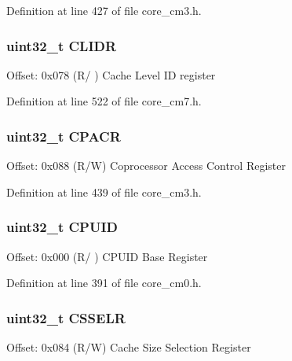 Definition at line 427 of file core\+\_\+cm3.\+h.

\subsubsection[{\texorpdfstring{C\+L\+I\+DR}{CLIDR}}]{ uint32\+\_\+t C\+L\+I\+DR}\hypertarget{struct_s_c_b___type_a40b4dc749a25d1c95c2125e88683a591}{}\label{struct_s_c_b___type_a40b4dc749a25d1c95c2125e88683a591}
Offset\+: 0x078 (R/ ) Cache Level ID register 

Definition at line 522 of file core\+\_\+cm7.\+h.

\subsubsection[{\texorpdfstring{C\+P\+A\+CR}{CPACR}}]{ uint32\+\_\+t C\+P\+A\+CR}\hypertarget{struct_s_c_b___type_ab8e9dd6ca5f31244ea352ed0c19155d8}{}\label{struct_s_c_b___type_ab8e9dd6ca5f31244ea352ed0c19155d8}
Offset\+: 0x088 (R/W) Coprocessor Access Control Register 

Definition at line 439 of file core\+\_\+cm3.\+h.

\subsubsection[{\texorpdfstring{C\+P\+U\+ID}{CPUID}}]{ uint32\+\_\+t C\+P\+U\+ID}\hypertarget{struct_s_c_b___type_adbf8292503748ba6421a523bdee6819d}{}\label{struct_s_c_b___type_adbf8292503748ba6421a523bdee6819d}
Offset\+: 0x000 (R/ ) C\+P\+U\+ID Base Register 

Definition at line 391 of file core\+\_\+cm0.\+h.

\subsubsection[{\texorpdfstring{C\+S\+S\+E\+LR}{CSSELR}}]{ uint32\+\_\+t C\+S\+S\+E\+LR}\hypertarget{struct_s_c_b___type_ae627674bc3ccfc2d67caccfc1f4ea4ed}{}\label{struct_s_c_b___type_ae627674bc3ccfc2d67caccfc1f4ea4ed}
Offset\+: 0x084 (R/W) Cache Size Selection Register 

